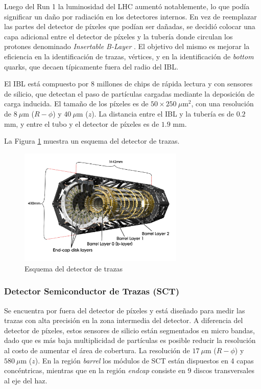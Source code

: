 Luego del Run 1 la luminosidad del LHC aumentó notablemente, lo que podía significar un daño por radiación en los detectores internos. En vez de reemplazar las partes del detector de píxeles que podían ser dañadas, se decidió colocar una capa adicional entre el detector de píxeles y la tubería donde circulan los protones denominado \textit{Insertable B-Layer} \cite{ATLAS-TDR-2010-19}. El objetivo del mismo es mejorar la eficiencia en la identificación de trazas, vértices, y en la identificación de \textit{bottom} quarks, que decaen típicamente fuera del radio del IBL.

El IBL está compuesto por $8$ millones de chips de rápida lectura y con sensores de silicio, que detectan el paso de partículas cargadas mediante la deposición de carga inducida. El tamaño de los píxeles es de $50\times250\:\mu$m$^{2}$, con una resolución de $8\:\mu$m ($R-\phi$) y $40\:\mu$m ($z$). La distancia entre el IBL y la tubería es de $0.2$ mm, y entre el tubo y el detector de píxeles es de $1.9$ mm. 

La Figura \ref{pixel_3} muestra un esquema del detector de trazas.


\begin{figure}
  \centering
  \includegraphics[width=0.7\textwidth]{images/pixel_3.png}
  \caption{Esquema del detector de trazas}
  \label{pixel_3}
\end{figure}

\subsubsection{Detector Semiconductor de Trazas (SCT)}

Se encuentra por fuera del detector de píxeles y está diseñado para medir las trazas con alta precisión en la zona intermedia del detector. A diferencia del detector de píxeles, estos sensores de silicio están segmentados en micro bandas, dado que es más baja multiplicidad de partículas es posible reducir la resolución al costo de aumentar el área de cobertura. La resolución de $17\:\mu$m ($R-\phi$) y $580\:\mu$m ($z$). En la región \textit{barrel} los módulos de SCT están dispuestos en 4 capas concéntricas, mientras que en la región \textit{endcap} consiste en 9 discos transversales al eje del haz.

